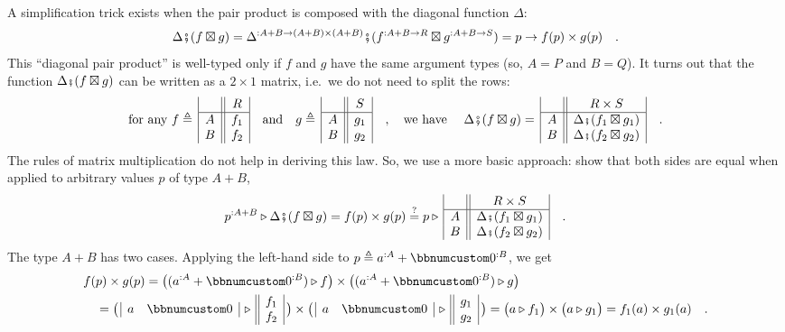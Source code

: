 A simplification trick exists when the pair product is composed with
the diagonal function $\Delta$:
\[
\Delta\bef(f\boxtimes g)=\Delta^{:A+B\rightarrow(A+B)\times(A+B)}\bef(f^{:A+B\rightarrow R}\boxtimes g^{:A+B\rightarrow S})=p\rightarrow f(p)\times g(p)\quad.
\]
This \textsf{``}diagonal pair product\textsf{''} is well-typed only if $f$ and $g$
have the same argument types (so, $A=P$ and $B=Q$). It turns out
that the function $\Delta\bef(f\boxtimes g)$ can be written as a
$2\times1$ matrix, i.e.~we do not need to split the rows:
\[
\text{for any }f\triangleq\,\begin{array}{|c||c|}
 & R\\
\hline A & f_{1}\\
B & f_{2}
\end{array}\quad\text{and}\quad g\triangleq\,\begin{array}{|c||c|}
 & S\\
\hline A & g_{1}\\
B & g_{2}
\end{array}\quad,\quad\text{we have }\quad\Delta\bef(f\boxtimes g)=\,\begin{array}{|c||c|}
 & R\times S\\
\hline A & \Delta\bef(f_{1}\boxtimes g_{1})\\
B & \Delta\bef(f_{2}\boxtimes g_{2})
\end{array}\quad.
\]
The rules of matrix multiplication do not help in deriving this law.
So, we use a more basic approach: show that both sides are equal when
applied to arbitrary values $p$ of type $A+B$,
\[
p^{:A+B}\triangleright\Delta\bef(f\boxtimes g)=f(p)\times g(p)\overset{?}{=}p\triangleright\,\begin{array}{|c||c|}
 & R\times S\\
\hline A & \Delta\bef(f_{1}\boxtimes g_{1})\\
B & \Delta\bef(f_{2}\boxtimes g_{2})
\end{array}\quad.
\]
The type $A+B$ has two cases. Applying the left-hand side to $p\triangleq a^{:A}+\bbnum 0^{:B}$,
we get
\begin{align*}
 & f(p)\times g(p)=\big((a^{:A}+\bbnum 0^{:B})\triangleright f\big)\times\big((a^{:A}+\bbnum 0^{:B})\triangleright g\big)\\
 & \quad=\big(\,\begin{array}{|cc|}
a & \bbnum 0\end{array}\,\triangleright\,\begin{array}{||c|}
f_{1}\\
f_{2}
\end{array}\,\big)\times\big(\,\begin{array}{|cc|}
a & \bbnum 0\end{array}\,\triangleright\,\begin{array}{||c|}
g_{1}\\
g_{2}
\end{array}\,\big)=\big(a\triangleright f_{1}\big)\times\big(a\triangleright g_{1}\big)=f_{1}(a)\times g_{1}(a)\quad.
\end{align*}
